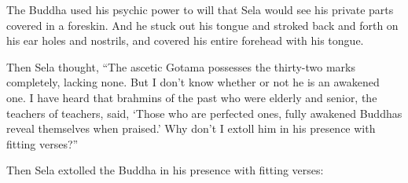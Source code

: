 \documentclass[12pt,openany]{book}%
\begin{document}
The Buddha used his psychic power to will that Sela would see his private parts covered in a foreskin. And he stuck out his tongue and stroked back and forth on his ear holes and nostrils, and covered his entire forehead with his tongue. 

Then Sela thought, “The ascetic Gotama possesses the thirty-two marks completely, lacking none. But I don’t know whether or not he is an awakened one. I have heard that brahmins of the past who were elderly and senior, the teachers of teachers, said, ‘Those who are perfected ones, fully awakened Buddhas reveal themselves when praised.’ Why don’t I extoll him in his presence with fitting verses?” 

Then Sela extolled the Buddha in his presence with fitting verses: 
\end{document}
